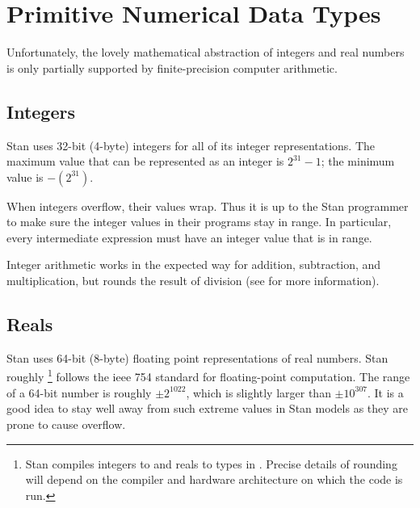 

\section{Primitive Numerical Data Types}\label{numerical-data-types.section}

Unfortunately, the lovely mathematical abstraction of integers and
real numbers is only partially supported by finite-precision computer
arithmetic.

\subsection{Integers}

Stan uses 32-bit (4-byte) integers for all of its integer
representations.  The maximum value that can be represented
as an integer is $2^{31}-1$; the minimum value is $-(2^{31})$.

When integers overflow, their values wrap.  Thus it is up to the Stan
programmer to make sure the integer values in their programs stay in
range.  In particular, every intermediate expression must have an
integer value that is in range.

Integer arithmetic works in the expected way for addition,
subtraction, and multiplication, but rounds the result of division
(see  for more information).

\subsection{Reals}

Stan uses 64-bit (8-byte) floating point representations of real
numbers.  Stan roughly%
%
\footnote{Stan compiles integers to  and reals to
   types in \Cpp.  Precise details of rounding will depend
  on the compiler and hardware architecture on which the code is run.}
%
follows the {\sc ieee} 754 standard for floating-point computation.
The range of a 64-bit number is roughly $\pm 2^{1022}$, which is
slightly larger than $\pm 10^{307}$.  It is a good idea to stay well
away from such extreme values in Stan models as they are prone to
cause overflow.

